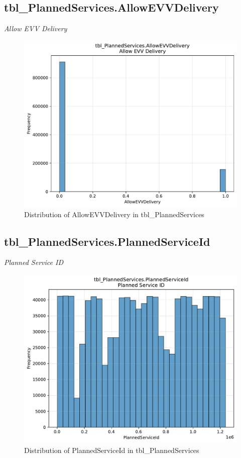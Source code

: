 \subsection{tbl\_PlannedServices.AllowEVVDelivery}
\textit{Allow EVV Delivery}

\begin{figure}[htbp]
\centering
\includegraphics[width=\textwidth]{figures/dbo_tbl_PlannedServices_AllowEVVDelivery.pdf}
\caption{Distribution of AllowEVVDelivery in tbl\_PlannedServices}
\end{figure}\newpage

\subsection{tbl\_PlannedServices.PlannedServiceId}
\textit{Planned Service ID}

\begin{figure}[htbp]
\centering
\includegraphics[width=\textwidth]{figures/dbo_tbl_PlannedServices_PlannedServiceId.pdf}
\caption{Distribution of PlannedServiceId in tbl\_PlannedServices}
\end{figure}\newpage

